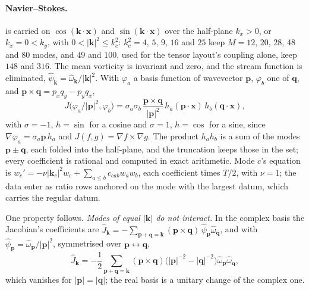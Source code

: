 \paragraph{Navier--Stokes.}  is carried on $\cos(\mathbf k\cdot\mathbf x)$ and $\sin(\mathbf k\cdot\mathbf x)$ over the half-plane $k_x>0$, or $k_x=0<k_y$, with $0<|\mathbf k|^2\le k_c^2$: $k_c^2=4$, $5$, $9$, $16$ and $25$ keep $M=12$, $20$, $28$, $48$ and $80$ modes, and $49$ and $100$, used for the tensor layout's coupling alone, keep $148$ and $316$. The mean vorticity is invariant and zero, and the stream function is eliminated, $\hat\psi_{\mathbf k}=\hat\omega_{\mathbf k}/|\mathbf k|^2$. With $\varphi_a$ a basis function of wavevector $\mathbf p$, $\varphi_b$ one of $\mathbf q$, and $\mathbf p\times\mathbf q=p_xq_y-p_yq_x$,
\begin{equation}
    J\bigl(\varphi_a/|\mathbf p|^2,\varphi_b\bigr)=\sigma_a\sigma_b\,\frac{\mathbf p\times\mathbf q}{|\mathbf p|^2}\,h_a(\mathbf p\cdot\mathbf x)\,h_b(\mathbf q\cdot\mathbf x),
\end{equation}
with $\sigma=-1$, $h=\sin$ for a cosine and $\sigma=1$, $h=\cos$ for a sine, since $\nabla\varphi_a=\sigma_a\mathbf p\,h_a$ and $J(f,g)=\nabla f\times\nabla g$. The product $h_ah_b$ is a sum of the modes $\mathbf p\pm\mathbf q$, each folded into the half-plane, and the truncation keeps those in the set; every coefficient is rational and computed in exact arithmetic. Mode $c$'s equation is $w_c'=-\nu|\mathbf k_c|^2w_c+\sum_{a\le b}c_{cab}w_aw_b$, each coefficient times $T/2$, with $\nu=1$; the data enter as ratio rows anchored on the mode with the largest datum, which carries the regular datum.

One property follows. \emph{Modes of equal $|\mathbf k|$ do not interact.} In the complex basis the Jacobian's coefficients are $\widehat J_{\mathbf k}=-\sum_{\mathbf p+\mathbf q=\mathbf k}(\mathbf p\times\mathbf q)\,\hat\psi_{\mathbf p}\hat\omega_{\mathbf q}$, and with $\hat\psi_{\mathbf p}=\hat\omega_{\mathbf p}/|\mathbf p|^2$, symmetrised over $\mathbf p\leftrightarrow\mathbf q$,
\begin{equation}
    \widehat J_{\mathbf k}=-\frac12\sum_{\mathbf p+\mathbf q=\mathbf k}(\mathbf p\times\mathbf q)\bigl(|\mathbf p|^{-2}-|\mathbf q|^{-2}\bigr)\hat\omega_{\mathbf p}\hat\omega_{\mathbf q},
\end{equation}
which vanishes for $|\mathbf p|=|\mathbf q|$; the real basis is a unitary change of the complex one.

